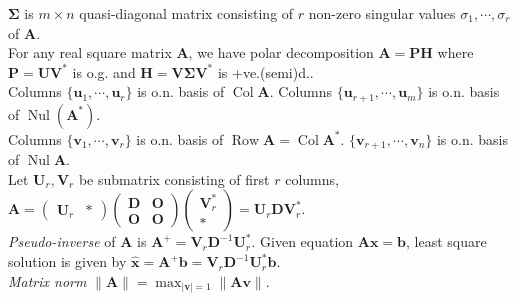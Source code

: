 \documentclass{article}
\theoremstyle{definition}
\DeclareMathOperator{\Nul}{Nul}
\DeclareMathOperator{\Col}{Col}
\DeclareMathOperator{\Row}{Row}
\begin{document}
$\mathbf{\Sigma}$ is $m\times n$ quasi-diagonal matrix consisting of $r$ non-zero singular values $\sigma_{1},\cdots,\sigma_{r}$ of $\mathbf{A}$.\\
For any real square matrix $\mathbf{A}$, we have polar decomposition $\mathbf{A}=\mathbf{PH}$ where $\mathbf{P}=\mathbf{UV}^{*}$ is o.g. and $\mathbf{H}=\mathbf{V\Sigma V}^{*}$ is +ve.(semi)d..\\
Columns $\{\mathbf{u}_{1},\cdots,\mathbf{u}_{r}\}$ is o.n. basis of $\Col{\mathbf{A}}$. Columns $\{\mathbf{u}_{r+1},\cdots,\mathbf{u}_{m}\}$ is o.n. basis of $\Nul(\mathbf{A}^{*})$.\\
Columns $\{\mathbf{v}_{1},\cdots,\mathbf{v}_{r}\}$ is o.n. basis of $\Row{\mathbf{A}}=\Col{\mathbf{A}^{*}}$. $\{\mathbf{v}_{r+1},\cdots,\mathbf{v}_{n}\}$ is o.n. basis of $\Nul{\mathbf{A}}$.\\
Let $\mathbf{U}_{r},\mathbf{V}_{r}$ be submatrix consisting of first $r$ columns, $\mathbf{A}=\begin{pmatrix}
    \mathbf{U}_{r} & *
\end{pmatrix}\begin{pmatrix}
    \mathbf{D} & \mathbf{O}\\
    \mathbf{O} & \mathbf{O}
\end{pmatrix}\begin{pmatrix}
    \mathbf{V}_{r}^{*}\\
    *
\end{pmatrix}=\mathbf{U}_{r}\mathbf{DV}_{r}^{*}$.\\
\textit{Pseudo-inverse} of $\mathbf{A}$ is $\mathbf{A}^{+}=\mathbf{V}_{r}\mathbf{D}^{-1}\mathbf{U}_{r}^{*}$. Given equation $\mathbf{Ax}=\mathbf{b}$, least square solution is given by $\hat{\mathbf{x}}=\mathbf{A}^{+}\mathbf{b}=\mathbf{V}_{r}\mathbf{D}^{-1}\mathbf{U}_{r}^{*}\mathbf{b}$.\\
\textit{Matrix norm} $\lVert\mathbf{A}\rVert=\max_{\lvert\mathbf{v}\rvert=1}\lVert\mathbf{Av}\rVert$.
\newpage
\end{document}
